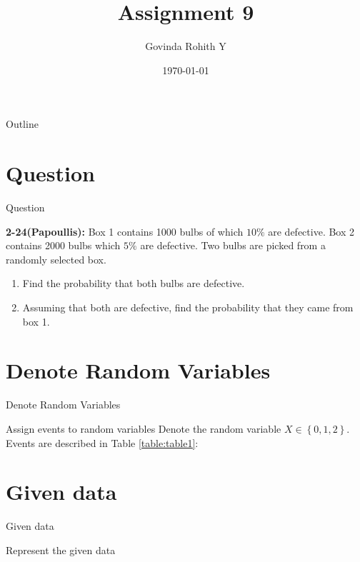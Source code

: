 \documentclass{beamer}
\title{Assignment 9}
\author{Govinda Rohith Y}
\date{\today}
\providecommand{\cbrak}[1]{\ensuremath{\left\{#1\right\}}}
\begin{document}
\begin{frame}
    \titlepage 
\end{frame}

\logo{}


\begin{frame}{Outline}
    \tableofcontents
\end{frame}


\section{Question}
\begin{frame}{Question}

\begin{block}{\textbf{2-24(Papoullis):}}
        Box 1 contains 1000 bulbs of which $10\%$ are defective. Box 2 contains 2000 bulbs which $5\%$ are defective. Two bulbs are picked from a randomly selected box.
\begin{enumerate}[label=(\alph*)]
    \item Find the probability that both bulbs are defective.
    \item Assuming that both are defective, find the probability that they came from box 1.
\end{enumerate}
    \end{block}

\end{frame}


\section{Denote Random Variables}
\begin{frame}{Denote Random Variables}
    \begin{block}{Assign events to random variables}
   Denote the random variable $X \in \cbrak{0,1,2}$. Events are described in Table \ref{table:table1}:
    \end{block}
    \begin{table}[h!]
	
	\caption{}
    \label{table:table1}
    \end{table}
     
     \end{frame} 
     \section{Given data}
     \begin{frame}{Given data}
\begin{block}{Represent the given data}

\end{block}
\begin{table}[h!]
	
	\caption{}
    \label{table:table2}
    \end{table}
\end{frame} 
\end{document}
